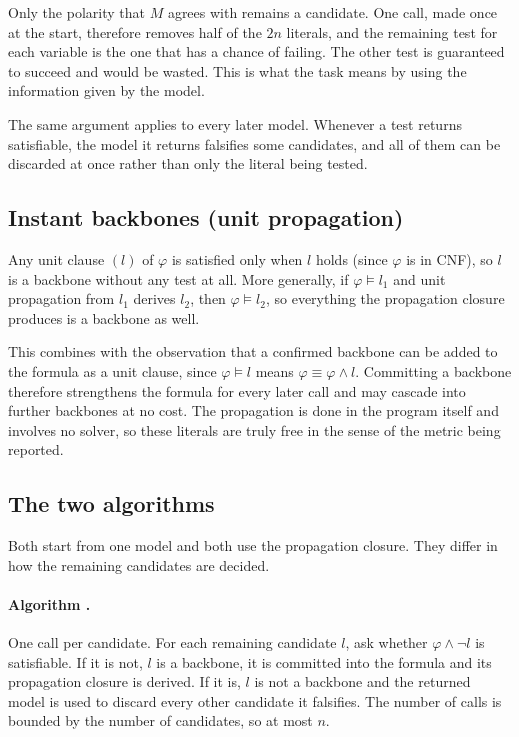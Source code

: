 \documentclass[11pt,a4paper]{article}
\begin{document}
Only the polarity that $M$ agrees with remains a candidate. One call, made
once at the start, therefore removes half of the $2n$ literals, and the
remaining test for each variable is the one that has a chance of failing. The
other test is guaranteed to succeed and would be wasted. This is what the task
means by using the information given by the model.

The same argument applies to every later model. Whenever a test returns
satisfiable, the model it returns falsifies some candidates, and all of them
can be discarded at once rather than only the literal being tested.

\subsection*{Instant backbones (unit propagation)}

Any unit clause $(l)$ of $\varphi$ is satisfied only when $l$ holds (since $\varphi$ is in CNF), so $l$ is
a backbone without any test at all. More generally, if $\varphi \models l_1$
and unit propagation from $l_1$ derives $l_2$, then $\varphi \models l_2$, so
everything the propagation closure produces is a backbone as well.

This combines with the observation that a confirmed backbone can be added to
the formula as a unit clause, since $\varphi \models l$ means
$\varphi \equiv \varphi \wedge l$. Committing a backbone therefore strengthens
the formula for every later call and may cascade into further backbones at no
cost. The propagation is done in the program itself and involves no solver, so
these literals are truly free in the sense of the metric being reported.

\subsection*{The two algorithms}

Both start from one model and both use the propagation closure. They
differ in how the remaining candidates are decided.

\paragraph{Algorithm .}
One call per candidate. For each remaining candidate $l$, ask whether
$\varphi \wedge \neg l$ is satisfiable. If it is not, $l$ is a backbone, it is
committed into the formula and its propagation closure is derived. If it is,
$l$ is not a backbone and the returned model is used to discard every other
candidate it falsifies. The number of calls is bounded by the number of
candidates, so at most $n$.
\end{document}

